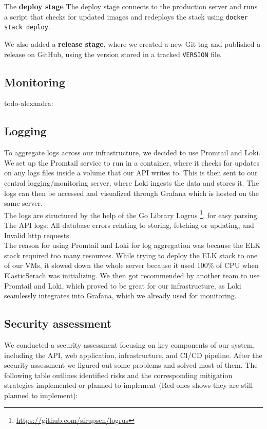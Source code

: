 The \textbf{deploy stage} The deploy stage connects to the production server and runs a script that checks for updated images and redeploys the stack using \texttt{docker stack deploy}.

We also added a \textbf{release stage}, where we created a new Git tag and published a release on GitHub, using the version stored in a tracked \texttt{VERSION} file.

\subsection{Monitoring} \label{sec:monitoring}

todo-alexandra: 


\subsection{Logging}
To aggregate logs across our infrastructure, we decided to use Promtail and Loki. We set up the Promtail service to run in a  container, where it checks for updates on any logs files inside a volume that our API writes to. This is then sent to our central logging/monitoring server, where Loki ingests the data and stores it. The logs can then be accessed and visualized through Grafana which is hosted on the same server.
\\

The logs are structured by the help of the Go Library Logrus \footnote{\url{https://github.com/sirupsen/logrus}}, for easy parsing. The API logs: All database errors relating to storing, fetching or updating, and Invalid http requests.
\\

The reason for using Promtail and Loki for log aggregation was because the ELK stack required too many resources. While trying to deploy the ELK stack to one of our VMs, it slowed down the whole server because it used 100\% of CPU when ElasticSerach was initializing. We then got recommended by another team to use Promtail and Loki, which proved to be great for our infrastructure, as Loki seamlessly integrates into Grafana, which we already used for monitoring.


\subsection{Security assessment}
We conducted a security assessment focusing on key components of our system, including the API, web application, infrastructure, and CI/CD pipeline. After the security assessment we figured out some problems and solved most of them. The following table outlines identified risks and the corresponding mitigation strategies implemented or planned to implement (Red ones shows they are still planned to implement):

